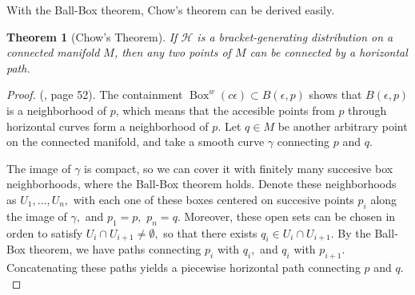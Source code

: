 \documentclass[12pt, letterpaper, reqno]{amsart}
\theoremstyle{definition}
\theoremstyle{plain}
\newtheorem{thm}{Theorem}
\theoremstyle{remark}
\begin{document}
With the Ball-Box theorem, Chow's theorem can be derived easily.

\begin{thm}[Chow's Theorem]
	If $ \mathcal{H} $ is a bracket-generating distribution on a connected manifold $ M $, then any two points of $ M $ can be connected by a horizontal path.
\end{thm}
\begin{proof} (\cite{montgomery2002tour}, page 52). The containment $ \operatorname{Box}^w(c\epsilon) \subset B(\epsilon,p)$ shows that $ B(\epsilon, p) $ is a neighborhood of $ p $, which means that the accesible points from $ p $ through horizontal curves form a neighborhood of $ p. $ Let $ q\in M $ be another arbitrary point on the connected manifold, and take a smooth curve $ \gamma $ connecting $ p $ and $ q. $  

	The image of $ \gamma $ is compact, so we can cover it with finitely many succesive box neighborhoods, where the Ball-Box theorem holds. Denote these neighborhoods as $ U_1,\dots,U_n, $ with each one of these boxes centered on succesive points $ p_i $ along the image of $ \gamma, $ and $ p_1=p, $ $ p_n=q. $ Moreover, these open sets can be chosen in orden to satisfy $ U_i\cap U_{i+1}\neq\emptyset, $ so that there exists $ q_i \in U_i\cap U_{i+1}. $ By the Ball-Box theorem, we have paths connecting $ p_i $ with $ q_i, $ and $ q_i $ with $ p_{i+1}. $ Concatenating these paths yields a piecewise horizontal path connecting $ p $ and $ q. $ 
	
\end{proof}
\end{document}
